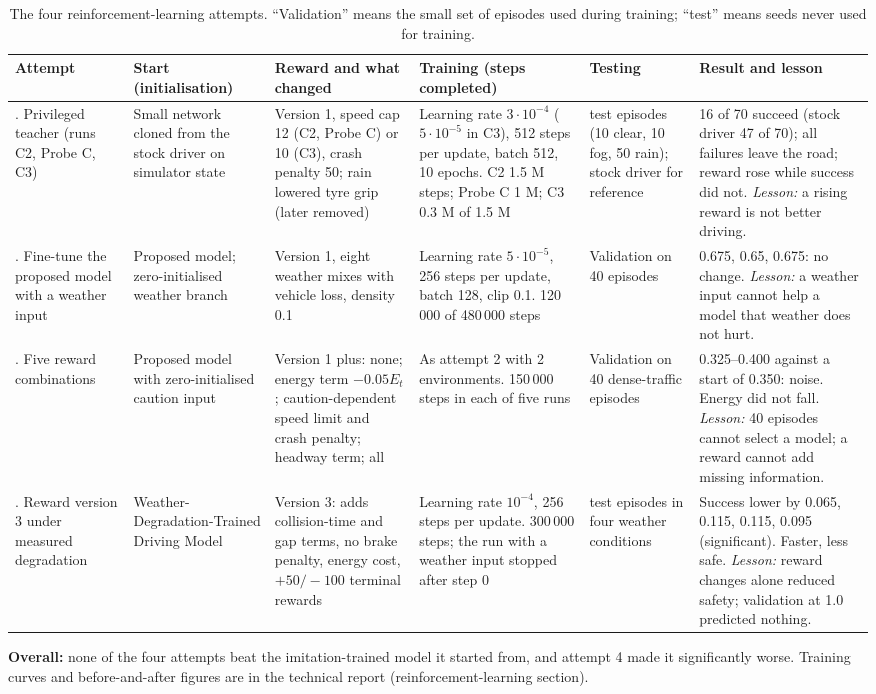 \documentclass[11pt,a4paper]{article}
\begin{document}
\begin{table}[H]\centering\scriptsize
\caption{The four reinforcement-learning attempts. ``Validation'' means the small set of episodes used during training; ``test'' means seeds never used for training.}\label{tab:rlfour}
\begin{tabularx}{\textwidth}{@{}>{\raggedright\arraybackslash}p{2.1cm}>{\raggedright\arraybackslash}p{2.2cm}>{\raggedright\arraybackslash}p{2.6cm}>{\raggedright\arraybackslash}p{2.7cm}>{\raggedright\arraybackslash}p{2.1cm}X@{}}\toprule
Attempt & Start (initialisation) & Reward and what changed & Training (steps completed) & Testing & Result and lesson\\\midrule
1. Privileged teacher (runs C2, Probe C, C3) & Small network cloned from the stock driver on simulator state & Version 1, speed cap 12 (C2, Probe C) or 10 (C3), crash penalty 50; rain lowered tyre grip (later removed) & Learning rate $3\cdot10^{-4}$ ($5\cdot10^{-5}$ in C3), 512 steps per update, batch 512, 10 epochs. C2 1.5 M steps; Probe C 1 M; C3 0.3 M of 1.5 M & 70 test episodes (10 clear, 10 fog, 50 rain); stock driver for reference & 16 of 70 succeed (stock driver 47 of 70); all failures leave the road; reward rose while success did not. \emph{Lesson:} a rising reward is not better driving.\\
2. Fine-tune the proposed model with a weather input & Proposed model; zero-initialised weather branch & Version 1, eight weather mixes with vehicle loss, density 0.1 & Learning rate $5\cdot10^{-5}$, 256 steps per update, batch 128, clip 0.1. 120\,000 of 480\,000 steps & Validation on 40 episodes & 0.675, 0.65, 0.675: no change. \emph{Lesson:} a weather input cannot help a model that weather does not hurt.\\
3. Five reward combinations & Proposed model with zero-initialised caution input & Version 1 plus: none; energy term $-0.05E_t$; caution-dependent speed limit and crash penalty; headway term; all & As attempt 2 with 2 environments. 150\,000 steps in each of five runs & Validation on 40 dense-traffic episodes & 0.325--0.400 against a start of 0.350: noise. Energy did not fall. \emph{Lesson:} 40 episodes cannot select a model; a reward cannot add missing information.\\
4. Reward version 3 under measured degradation & Weather-Degradation-Trained Driving Model & Version 3: adds collision-time and gap terms, no brake penalty, energy cost, $+50/-100$ terminal rewards & Learning rate $10^{-4}$, 256 steps per update. 300\,000 steps; the run with a weather input stopped after step 0 & 200 test episodes in four weather conditions & Success lower by 0.065, 0.115, 0.115, 0.095 (significant). Faster, less safe. \emph{Lesson:} reward changes alone reduced safety; validation at 1.0 predicted nothing.\\\bottomrule
\end{tabularx}
\end{table}
\textbf{Overall:} none of the four attempts beat the imitation-trained model it started from, and attempt 4 made it significantly worse. Training curves and before-and-after figures are in the technical report (reinforcement-learning section).
\end{document}
